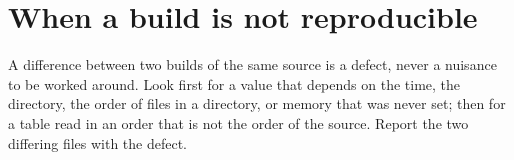 \section{When a build is not reproducible}
A difference between two builds of the same source is a defect, never a
nuisance to be worked around.  Look first for a value that depends on the
time, the directory, the order of files in a directory, or memory that
was never set; then for a table read in an order that is not the order of
the source.  Report the two differing files with the defect.
